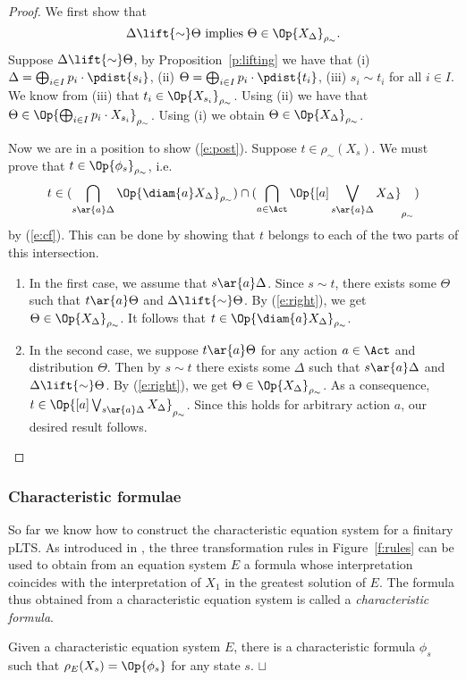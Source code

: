 \documentclass{article}
\def \BISI{\sim}
\newcommand{\boxm}[1]{[#1]}
\def\squareforqed{\hbox{\rlap{$\sqcap$}$\sqcup$}}
\def\qed{\ifmmode\squareforqed\else{\unskip\nobreak\hfil
\penalty50\hskip1em\null\nobreak\hfil\squareforqed
\parfillskip=0pt\finalhyphendemerits=0\endgraf}\fi}
\begin{document}
\begin{proof}
We first show that
\begin{equation}\label{e:right}
\Delta\lift{\BISI}\Theta\ {\rm implies}\
\Theta\in\Op{X_\Delta}_{\rho_\BISI}.
\end{equation}
Suppose $\Delta\lift{\BISI}\Theta$, by Proposition~\ref{p:lifting}
we have that (i) $\Delta=\bigoplus_{i\in I}p_i\cdot\pdist{s_i}$,
(ii) $\Theta=\bigoplus_{i\in I}p_i\cdot\pdist{t_i}$, (iii) $s_i\BISI
t_i$ for all $i\in I$. We know from (iii) that
$t_i\in\Op{X_{s_i}}_{\rho_\BISI}$. Using (ii) we have that
$\Theta\in\Op{\bigoplus_{i\in I}p_i\cdot X_{s_i}}_{\rho_\BISI}$.
Using (i) we obtain $\Theta\in\Op{X_\Delta}_{\rho_\BISI}$.

Now we are in a position to show (\ref{e:post}). Suppose $t\in
\rho_\BISI(X_s)$. We must prove that $t\in
\Op{\phi_s}_{\rho_\BISI}$, i.e.
\[t\in
(\bigcap_{s\ar{a}\Delta}\Op{\diam{a}X_\Delta}_{\rho_\BISI}) \cap
(\bigcap_{a\in\Act}\Op{\boxm{a}\bigvee_{s\ar{a}\Delta}X_{\Delta}}_{\rho_\BISI})\]
by (\ref{e:cf}). This can be done by showing that $t$ belongs to
each of the two parts of this intersection.
\begin{enumerate}
\item In the first case, we assume that $s\ar{a}\Delta$. Since $s\BISI
  t$, there exists some $\Theta$ such that $t\ar{a}\Theta$ and
  $\Delta \lift{\BISI} \Theta$. By (\ref{e:right}), we get
  $\Theta\in\Op{X_\Delta}_{\rho_\BISI}$. It follows that $t\in
  \Op{\diam{a}X_\Delta}_{\rho_\BISI}$.

\item In the second case, we suppose $t\ar{a}\Theta$ for any action $a\in\Act$ and distribution $\Theta$. Then by $s\BISI t$ there exists some
 $\Delta$ such that   $s\ar{a}\Delta$ and $\Delta \lift{\BISI}
 \Theta$. By (\ref{e:right}), we get
 $\Theta\in\Op{X_\Delta}_{\rho_\BISI}$. As a consequence,
 $t\in \Op{\boxm{a}\bigvee_{s\ar{a}\Delta}X_{\Delta}}_{\rho_\BISI}$.
 Since this holds for arbitrary action $a$, our desired result
 follows.
\end{enumerate}
\end{proof}


\subsubsection{Characteristic formulae} So far we know how to
construct the characteristic equation system for a finitary pLTS. As
introduced in \cite{Mul98}, the three transformation rules in
Figure~\ref{f:rules} can be used to obtain from an equation system
$E$ a formula whose interpretation coincides with the interpretation
of $X_1$ in the greatest solution of $E$. The formula thus obtained
from a characteristic equation system is called a {\em
characteristic formula}.
\begin{theorem}
Given a characteristic equation system $E$, there is a
characteristic formula $\phi_s$ such that $\rho_E(X_s)=\Op{\phi_s}$
for any state $s$. \hfill\qed
\end{theorem}
\end{document}
